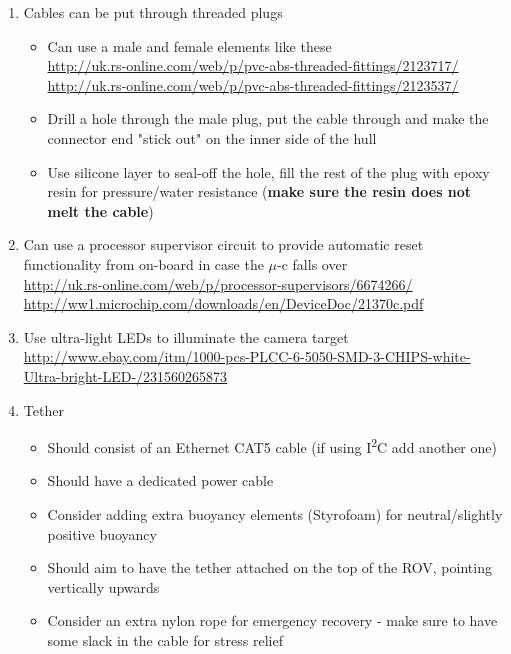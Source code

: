\documentclass[11pt,a4paper,oneside]{report}
\begin{document}
\begin{enumerate}
\item Cables can be put through threaded plugs
	\begin{itemize}
	\item Can use a male and female elements like these \\
		\url{http://uk.rs-online.com/web/p/pvc-abs-threaded-fittings/2123717/} \\
		\url{http://uk.rs-online.com/web/p/pvc-abs-threaded-fittings/2123537/}
	\item Drill a hole through the male plug, put the cable through and make the
		connector end "stick out" on the inner side of the hull
	\item Use silicone layer to seal-off the hole, fill the rest of the plug with
		epoxy resin for pressure/water resistance (\textbf{make sure the resin does not
		melt the cable})
	\end{itemize}

\item Can use a processor supervisor circuit to provide automatic reset functionality
	from on-board in case the $\mu$-c falls over \\
	\url{http://uk.rs-online.com/web/p/processor-supervisors/6674266/} \\
	\url{http://ww1.microchip.com/downloads/en/DeviceDoc/21370c.pdf}

\item Use ultra-light LEDs to illuminate the camera target \\
	\url{http://www.ebay.com/itm/1000-pcs-PLCC-6-5050-SMD-3-CHIPS-white-Ultra-bright-LED-/231560265873}

\item Tether
	\begin{itemize}
	\item Should consist of an Ethernet CAT5 cable (if using I\textsuperscript{2}C add another one)
	\item Should have a dedicated power cable
	\item Consider adding extra buoyancy elements (Styrofoam) for neutral/slightly positive buoyancy
	\item Should aim to have the tether attached on the top of the ROV, pointing vertically upwards
	\item Consider an extra nylon rope for emergency recovery - make sure to have some slack in the cable
		for stress relief
	\end{itemize}


\end{enumerate}
\end{document}
